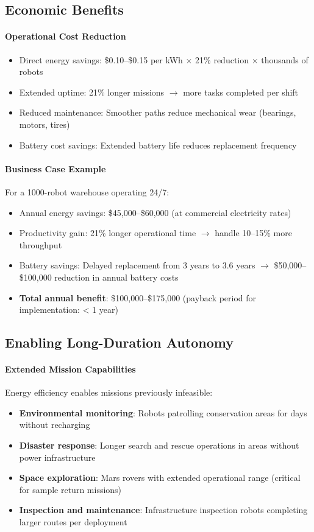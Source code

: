\subsection{Economic Benefits}

\paragraph{Operational Cost Reduction}
\begin{itemize}
    \item Direct energy savings: \$0.10--\$0.15 per kWh $\times$ 21\% reduction $\times$ thousands of robots
    \item Extended uptime: 21\% longer missions $\rightarrow$ more tasks completed per shift
    \item Reduced maintenance: Smoother paths reduce mechanical wear (bearings, motors, tires)
    \item Battery cost savings: Extended battery life reduces replacement frequency
\end{itemize}

\paragraph{Business Case Example}
For a 1000-robot warehouse operating 24/7:
\begin{itemize}
    \item Annual energy savings: \$45,000--\$60,000 (at commercial electricity rates)
    \item Productivity gain: 21\% longer operational time $\rightarrow$ handle 10--15\% more throughput
    \item Battery savings: Delayed replacement from 3 years to 3.6 years $\rightarrow$ \$50,000--\$100,000 reduction in annual battery costs
    \item \textbf{Total annual benefit}: \$100,000--\$175,000 (payback period for implementation: < 1 year)
\end{itemize}

\subsection{Enabling Long-Duration Autonomy}

\paragraph{Extended Mission Capabilities}
Energy efficiency enables missions previously infeasible:
\begin{itemize}
    \item \textbf{Environmental monitoring}: Robots patrolling conservation areas for days without recharging
    \item \textbf{Disaster response}: Longer search and rescue operations in areas without power infrastructure
    \item \textbf{Space exploration}: Mars rovers with extended operational range (critical for sample return missions)
    \item \textbf{Inspection and maintenance}: Infrastructure inspection robots completing larger routes per deployment
\end{itemize}

